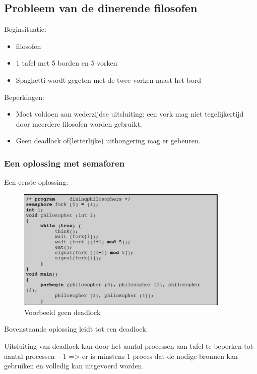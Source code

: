 \subsection{Probleem van de dinerende filosofen}

Beginsituatie:

\begin{itemize}
\item filosofen
\item 1  tafel met 5 borden en 5 vorken
\item Spaghetti wordt gegeten met de twee vorken naast het bord 
\end{itemize}

Beperkingen:

\begin{itemize}
\item Moet voldoen aan wederzijdse uitsluiting: een vork mag niet tegelijkertijd door meerdere filosofen worden gebruikt.
\item Geen deadlock of(letterlijke) uithongering mag er gebeuren.
\end{itemize}

\subsubsection{Een oplossing met semaforen }

Een eerste oplossing:
 
 
 
 \begin{figure}[htp]
    \centering
            \includegraphics[width=4in]{img/oplossingsemafoor.jpg}
        \caption{Voorbeeld geen deadlock}
    \label{fig:Voorbeeld geen deadlock}
\end{figure}

Bovenstaande oplossing leidt tot een deadlock.




Uitsluiting van deadlock kan door het aantal processen aan tafel te beperken tot aantal processen – 1 => er is minstens 1 proces dat de nodige bronnen kan gebruiken en volledig kan uitgevoerd worden.

